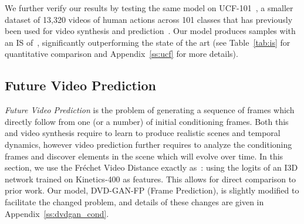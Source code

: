 \documentclass{article} \usepackage{iclr2020_conference,times}
\begin{document}
We further verify our results by testing the same model on UCF-101~\citep{soomro2012ucf101}, a smaller dataset of 13,320 videos of human actions across 101 classes that has previously been used for video synthesis and prediction~\citep{saito2017temporal, saito2018tganv2, tulyakov2018mocogan}. Our model produces samples with an IS of~, significantly outperforming the state of the art (see Table~\ref{tab:is} for quantitative comparison and Appendix~\ref{ss:ucf} for more details).

\subsection{Future Video Prediction}

\textit{Future Video Prediction} is the problem of generating a sequence of frames which directly follow from one (or a number) of initial conditioning frames. Both this and video synthesis require  to learn to produce realistic scenes and temporal dynamics, however video prediction further requires  to analyze the conditioning frames and discover elements in the scene which will evolve over time. In this section, we use the Fr\'echet Video Distance exactly as~\citet{unterthiner2018towards}: using the logits of an I3D network trained on Kinetics-400 as features. This allows for direct comparison to prior work. Our model, DVD-GAN-FP (Frame Prediction), is slightly modified to facilitate the changed problem, and details of these changes are given in Appendix~\ref{ss:dvdgan_cond}.

\begin{figure}[t]
\CenterFloatBoxes
\begin{floatrow}
\end{floatrow}
\end{figure}
\end{document}

